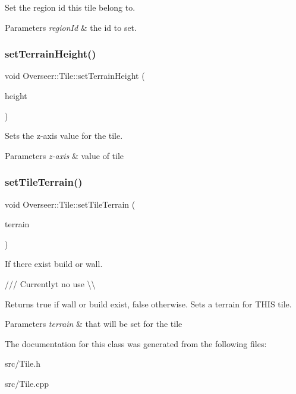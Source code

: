Set the region id this tile belong to. 


\begin{DoxyParams}{Parameters}
{\em region\+Id} & the id to set. \\
\hline
\end{DoxyParams}
\mbox{\label{classOverseer_1_1Tile_a79f2aa12d9463e7e4bfc85b8bdddbc34}} 
\subsubsection{\texorpdfstring{set\+Terrain\+Height()}{setTerrainHeight()}}
{\footnotesize\ttfamily void Overseer\+::\+Tile\+::set\+Terrain\+Height (\begin{DoxyParamCaption}\item[{float}]{height }\end{DoxyParamCaption})}



Sets the z-\/axis value for the tile. 


\begin{DoxyParams}{Parameters}
{\em z-\/axis} & value of tile \\
\hline
\end{DoxyParams}
\mbox{\label{classOverseer_1_1Tile_a22494032e2b92af9c4e4b375845fd80f}} 
\subsubsection{\texorpdfstring{set\+Tile\+Terrain()}{setTileTerrain()}}
{\footnotesize\ttfamily void Overseer\+::\+Tile\+::set\+Tile\+Terrain (\begin{DoxyParamCaption}\item[{Tile\+Terrain \&}]{terrain }\end{DoxyParamCaption})}



If there exist build or wall. 

/// Currentlyt no use \textbackslash{}\textbackslash{} \begin{DoxyReturn}{Returns}
true if wall or build exist, false otherwise. Sets a terrain for T\+H\+IS tile.
\end{DoxyReturn}

\begin{DoxyParams}{Parameters}
{\em terrain} & that will be set for the tile \\
\hline
\end{DoxyParams}


The documentation for this class was generated from the following files\+:\begin{DoxyCompactItemize}
\item 
src/Tile.\+h\item 
src/Tile.\+cpp\end{DoxyCompactItemize}

